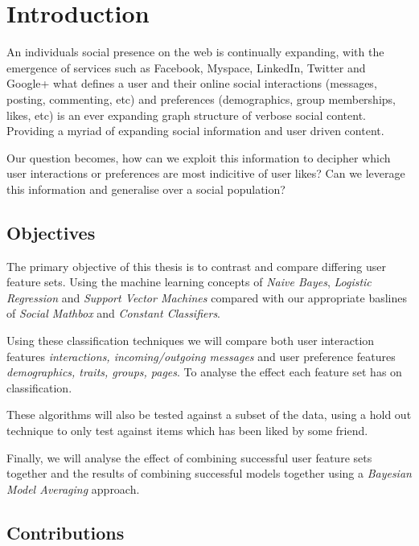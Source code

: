 
\chapter{Introduction}
\label{cha:intro}

An individuals social presence on the web is continually expanding, with the emergence of services such as Facebook, Myspace, LinkedIn, Twitter 
and Google+ what defines a user and their online social interactions (messages, posting, commenting, etc) and preferences 
(demographics, group memberships, likes, etc) is an ever expanding graph structure of verbose social content. Providing a myriad of expanding
social information and user driven content.

Our question becomes, how can we exploit this information to decipher which user interactions or preferences are most indicitive of user likes?
Can we leverage this information and generalise over a social population?

\section{Objectives}
\label{sec:objectives}

The primary objective of this thesis is to contrast and compare differing user feature sets. Using the
machine learning concepts of \emph{Naive Bayes}, \emph{Logistic Regression} and \emph{Support Vector Machines} compared with our 
appropriate baslines of \emph{Social Mathbox} and \emph{Constant Classifiers}.

Using these classification techniques we will compare both user interaction features 
\emph{interactions, incoming/outgoing messages} and user preference features \emph{demographics, traits, groups, pages}. To analyse the effect 
each feature set has on classification.

These algorithms will also be tested against a subset of the data, using a hold out technique to only test against items which has been liked
by some friend.

Finally, we will analyse the effect of combining successful user feature sets together and the results of combining successful models together 
using a \emph{Bayesian Model Averaging} approach.

\section{Contributions}
\label{sec:contributions}

